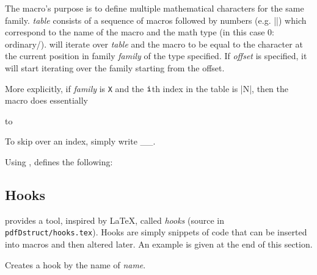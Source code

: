 The \macro\mathfonttable{} macro's purpose is to define multiple mathematical characters for the same family.
{\it table} consists of a sequence of macros followed by numbers (e.g. \inlinecode||) which correspond to the name of the macro and the math type (in this case $0$: ordinary/\macro\mathord).
\macro\mathfonttable{} will iterate over {\it table} and \macro\mathchardef{} the macro to be equal to the character at the current position in family {\it family} of the type specified.
If {\it offset} is specified, it will start iterating over the family starting from the offset.

More explicitly, if {\it family} is {\tt X} and the $\tt i$th index in the table is \inlinecode|\X N|, then the macro does essentially

\hbox to

To skip over an index, simply write \macro\__{}.
\emacroexp

Using \macro\mathfonttable, \pdftoolbox{} defines the following:

{\tabskip=2pt}

\subsection{Hooks}

\pdftoolbox{} provides a tool, inspired by \LaTeX, called {\it hooks} (source in {\tt pdfDstruct/hooks.tex}).
Hooks are simply snippets of code that can be inserted into macros and then altered later.
An example is given at the end of this section.

Creates a hook by the name of {\it name}.
\emacroexp

